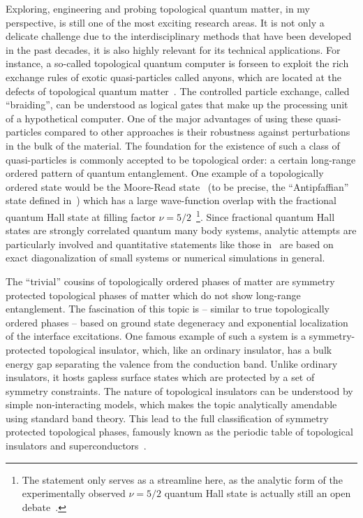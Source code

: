 Exploring, engineering and probing topological quantum matter, in my perspective, is still one of the most exciting research areas.
It is not only a delicate challenge due to the interdisciplinary methods that have been developed in the past decades, it is also highly relevant for its technical applications.
For instance, a so-called topological quantum computer is forseen to exploit the rich exchange rules of exotic quasi-particles called anyons, which are located at the defects of topological quantum matter~\cite{Freedman2002}.
The controlled particle exchange, called ``braiding'', can be understood as logical gates that make up the processing unit of a hypothetical computer.
One of the major advantages of using these quasi-particles compared to other approaches is their robustness against perturbations in the bulk of the material.
The foundation for the existence of such a class of quasi-particles is commonly accepted to be topological order: a certain long-range ordered pattern of quantum entanglement.
One example of a topologically ordered state would be the Moore-Read state~\cite{Moore1991,Read1996} (to be precise, the ``Antipfaffian'' state defined in~\cite{Levin2007,Lee2007}) which has a large wave-function overlap with the fractional quantum Hall state at filling factor $\nu=5/2$~\cite{Storni2010,Rezayi2017}\footnote{The statement only serves as a streamline here, as the analytic form of the experimentally observed $\nu=5/2$ quantum Hall state is actually still an open debate~\cite{Simon2020}.}.
Since fractional quantum Hall states are strongly correlated quantum many body systems, analytic attempts are particularly involved and quantitative statements like those in~\cite{Storni2010} are based on exact diagonalization of small systems or numerical simulations in general.

The ``trivial'' cousins of topologically ordered phases of matter are symmetry protected topological phases of matter which do not show long-range entanglement.
The fascination of this topic is -- similar to true topologically ordered phases -- based on ground state degeneracy and exponential localization of the interface excitations.
One famous example of such a system is a symmetry-protected topological insulator, which, like an ordinary insulator, has a bulk energy gap separating the valence from the conduction band.
Unlike ordinary insulators, it hosts gapless surface states which are protected by a set of symmetry constraints.
The nature of topological insulators can be understood by simple non-interacting models, which makes the topic analytically amendable using standard band theory.
This lead to the full classification of symmetry protected topological phases, famously known as the periodic table of topological insulators and superconductors~\cite{Altland1997,Kitaev2009}.

